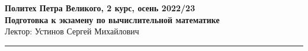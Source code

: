 \documentclass[a4paper,12pt]{article}
\begin{document}
    \begin{center}
        \Large
        \textbf{Политех Петра Великого, 2 курс, осень 2022/23}\\[10pt]
        \textbf{Подготовка к экзамену по вычислительной математике}\\[10pt]
        \normalsize
        Лектор: Устинов Сергей Михайлович
        \rule{\linewidth}{0.4pt}
    \end{center}
    \tableofcontents
    \newpage
    \pagestyle{fancy}
    \renewcommand{\sectionmark}[1]{\markright{\thesection\ #1}}
    \fancyhead[LE,RO]{}
    \renewcommand{\footrulewidth}{0.4pt}
    \fancyfoot[C]{\thepage/\pageref{LastPage}}


\end{document}
